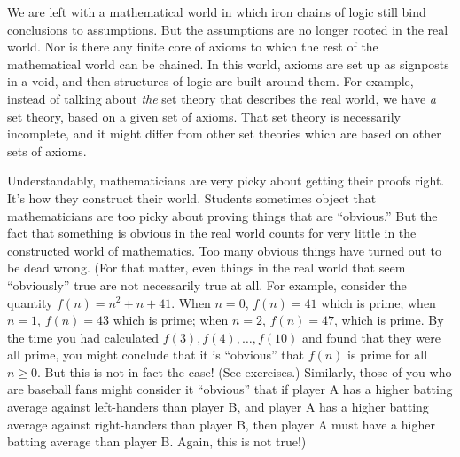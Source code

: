 We are left with a mathematical world in which iron chains of
logic still bind conclusions to assumptions.  But the assumptions
are no longer rooted in the real world.  Nor is there any finite core
of axioms to which the rest of the mathematical world can be chained.
In this world, axioms are set up as signposts in a void, and then
structures of logic are built around them.  
For example, instead of talking about
\emph{the} set theory that describes the real world, we have \emph{a}
set theory, based on a given set of axioms.  That set theory is
necessarily incomplete, and it might differ from other set theories
which are based on other sets of axioms.



Understandably, mathematicians are very picky about getting their
proofs right.  It's how they construct their world.  Students
sometimes object that mathematicians are too picky about proving
things that are ``obvious.'' But the fact that something is
obvious in the real world counts for very little in the constructed
world of mathematics.  Too many obvious things have turned
out to be dead wrong.  (For that matter, even things in the real
world that seem ``obviously'' true are not necessarily true at all.
For example, consider the quantity $f(n) = n^2 + n + 41$.  When $n=0$, $f(n)=41$ which is
prime; when $n=1$, $f(n) = 43$ which is prime; when $n=2$, $f(n) = 47$, which is prime.
By the time you had calculated $f(3), f(4), \ldots, f(10)$ and found that they were all
prime, you might conclude that it is ``obvious'' that $f(n)$ is prime for all $n\geq 0$.
But this is not in fact the case!  (See exercises.)
Similarly, those of you who are baseball fans might consider it ``obvious'' that if
player A has a higher batting average against left-handers than player B, and player A has
a higher batting average against right-handers than player B, then player A must have
a higher batting average than player B.  Again, this is not true!) 


\medbreak



